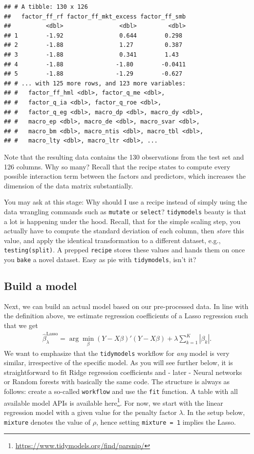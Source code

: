 \documentclass[
]{book}
\renewcommand{\href}[2]{#2\footnote{\url{#1}}}
\begin{document}
\begin{verbatim}
## # A tibble: 130 x 126
##   factor_ff_rf factor_ff_mkt_excess factor_ff_smb
##          <dbl>                <dbl>         <dbl>
## 1        -1.92                0.644        0.298 
## 2        -1.88                1.27         0.387 
## 3        -1.88                0.341        1.43  
## 4        -1.88               -1.80        -0.0411
## 5        -1.88               -1.29        -0.627 
## # ... with 125 more rows, and 123 more variables:
## #   factor_ff_hml <dbl>, factor_q_me <dbl>,
## #   factor_q_ia <dbl>, factor_q_roe <dbl>,
## #   factor_q_eg <dbl>, macro_dp <dbl>, macro_dy <dbl>,
## #   macro_ep <dbl>, macro_de <dbl>, macro_svar <dbl>,
## #   macro_bm <dbl>, macro_ntis <dbl>, macro_tbl <dbl>,
## #   macro_lty <dbl>, macro_ltr <dbl>, ...
\end{verbatim}

Note that the resulting data contains the 130 observations from the test set and 126 columns. Why so many? Recall that the recipe states to compute every possible interaction term between the factors and predictors, which increases the dimension of the data matrix substantially.

You may ask at this stage: Why should I use a recipe instead of simply using the data wrangling commands such as \texttt{mutate} or \texttt{select}? \texttt{tidymodels} beauty is that a lot is happening under the hood. Recall, that for the simple scaling step, you actually have to compute the standard deviation of each column, then \emph{store} this value, and apply the identical transformation to a different dataset, e.g., \texttt{testing(split)}. A prepped \texttt{recipe} stores these values and hands them on once you \texttt{bake} a novel dataset. Easy as pie with \texttt{tidymodels}, isn't it?

\hypertarget{build-a-model}{%
\subsection{Build a model}\label{build-a-model}}

Next, we can build an actual model based on our pre-processed data. In line with the definition above, we estimate regression coefficients of a Lasso regression such that we get
\[\begin{aligned}\hat\beta_\lambda^\text{Lasso} = \arg\min_\beta \left(Y - X\beta\right)'\left(Y - X\beta\right) + \lambda\sum\limits_{k=1}^K|\beta_k|.\end{aligned}\] We want to emphasize that the \texttt{tidymodels} workflow for \emph{any} model is very similar, irrespective of the specific model. As you will see further below, it is straightforward to fit Ridge regression coefficients and - later - Neural networks or Random forests with basically the same code. The structure is always as follows: create a so-called \texttt{workflow} and use the \texttt{fit} function. A table with all available model APIs is available \href{https://www.tidymodels.org/find/parsnip/}{here}.
For now, we start with the linear regression model with a given value for the penalty factor \(\lambda\). In the setup below, \texttt{mixture} denotes the value of \(\rho\), hence setting \texttt{mixture\ =\ 1} implies the Lasso.
\end{document}
